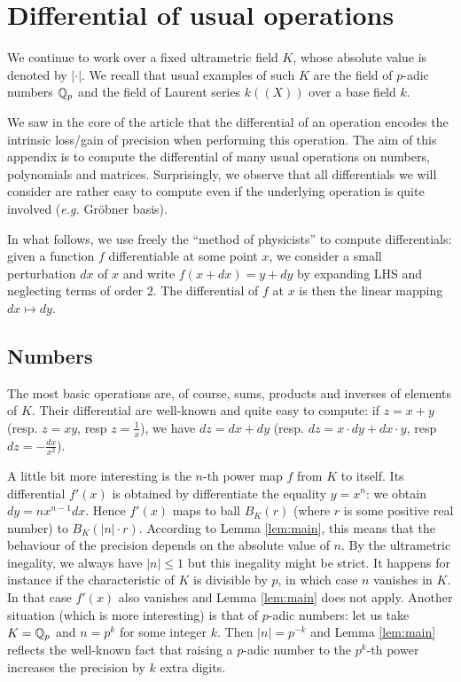 \documentclass{lms}
\begin{document}
\section{Differential of usual operations}
\label{ssec:differentials}

We continue to work over a fixed ultrametric field $K$, whose absolute 
value is denoted by $|\cdot|$. We recall that usual examples of such $K$ 
are the field of $p$-adic numbers $\mathbb Q_p$ and the field of Laurent series 
$k((X))$ over a base field $k$.

We saw in the core of the article that the differential of an operation 
encodes the intrinsic loss/gain of precision when performing this 
operation. The aim of this appendix is to compute the differential of 
many usual operations on numbers, polynomials and matrices. Surprisingly, 
we observe that all differentials we will consider are rather easy to 
compute even if the underlying operation is quite involved (\emph{e.g.} 
Gr\"obner basis).

In what follows, we use freely the ``method of physicists'' to compute 
differentials: given a function $f$ differentiable at some point $x$, we 
consider a small perturbation $dx$ of $x$ and write $f(x+dx) = y + dy$ 
by expanding LHS and neglecting terms of order $2$. The differential of 
$f$ at $x$ is then the linear mapping $dx \mapsto dy$.

\subsection{Numbers}

The most basic operations are, of course, sums, products and inverses of 
elements of $K$. Their differential are well-known and quite easy to 
compute: if $z = x + y$ (resp. $z = xy$, resp $z = \frac 1 x$), we have 
$dz = dx + dy$ (resp. $dz = x \cdot dy + dx \cdot y$, resp $dz = - 
\frac{dx}{x^2}$).

A little bit more interesting is the $n$-th power map $f$ from $K$ to 
itself. Its differential $f'(x)$ is obtained by differentiate the 
equality $y = x^n$: we obtain $dy = n x^{n-1} dx$.
Hence $f'(x)$ maps to ball $B_K(r)$ (where $r$ is some positive real 
number) to $B_K(|n|{\cdot} r)$. According to Lemma \ref{lem:main}, this 
means that the behaviour of the precision depends on the absolute value 
of $n$. By the ultrametric inegality, we always have $|n| \leq 1$ but 
this inegality might be strict. It happens for instance if the 
characteristic of $K$ is divisible by $p$, in which case $n$ vanishes in 
$K$. In that case $f'(x)$ also vanishes and Lemma \ref{lem:main} does 
not apply. 
Another situation (which is more interesting) is that of $p$-adic 
numbers: let us take $K = \mathbb Q_p$ and $n = p^k$ for some integer $k$. Then
$|n| = p^{-k}$ and Lemma \ref{lem:main} reflects the well-known fact that
raising a $p$-adic number to the $p^k$-th power increases the precision 
by $k$ extra digits.
\end{document}
